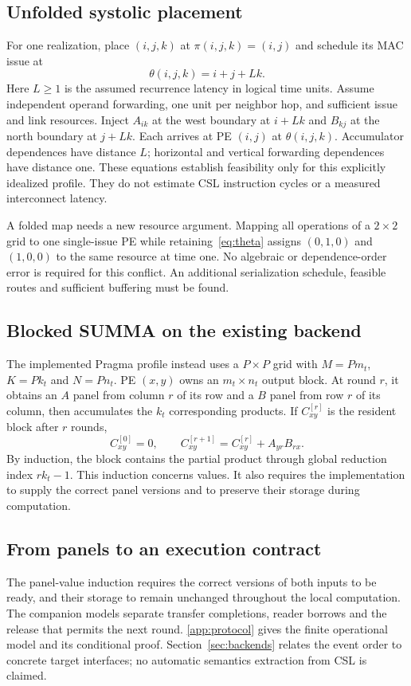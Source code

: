 \documentclass[final,3p,times,authoryear]{elsarticle}
\begin{document}
\subsection{Unfolded systolic placement}
For one realization, place $(i,j,k)$ at $\pi(i,j,k)=(i,j)$ and schedule its MAC issue at
\begin{equation}\label{eq:theta}
 \theta(i,j,k)=i+j+Lk.
\end{equation}
Here $L\ge1$ is the assumed recurrence latency in logical time units. Assume independent operand forwarding, one unit per neighbor hop, and sufficient issue and link resources. Inject $A_{ik}$ at the west boundary at $i+Lk$ and $B_{kj}$ at the north boundary at $j+Lk$. Each arrives at PE $(i,j)$ at $\theta(i,j,k)$. Accumulator dependences have distance $L$; horizontal and vertical forwarding dependences have distance one. These equations establish feasibility only for this explicitly idealized profile. They do not estimate CSL instruction cycles or a measured interconnect latency.

A folded map needs a new resource argument. Mapping all operations of a $2\times2$ grid to one single-issue PE while retaining~\eqref{eq:theta} assigns $(0,1,0)$ and $(1,0,0)$ to the same resource at time one. No algebraic or dependence-order error is required for this conflict. An additional serialization schedule, feasible routes and sufficient buffering must be found.

\subsection{Blocked SUMMA on the existing backend}
The implemented Pragma profile instead uses a $P\times P$ grid with $M=Pm_t$, $K=Pk_t$ and $N=Pn_t$. PE $(x,y)$ owns an $m_t\times n_t$ output block. At round $r$, it obtains an $A$ panel from column $r$ of its row and a $B$ panel from row $r$ of its column, then accumulates the $k_t$ corresponding products. If $C_{xy}^{[r]}$ is the resident block after $r$ rounds,
\begin{equation}\label{eq:summa}
 C_{xy}^{[0]}=0,\qquad
 C_{xy}^{[r+1]}=C_{xy}^{[r]}+A_{yr}B_{rx}.
\end{equation}
By induction, the block contains the partial product through global reduction index $rk_t-1$. This induction concerns values. It also requires the implementation to supply the correct panel versions and to preserve their storage during computation.


\subsection{From panels to an execution contract}
The panel-value induction requires the correct versions of both inputs to be ready, and their storage to remain unchanged throughout the local computation. The companion models separate transfer completions, reader borrows and the release that permits the next round. \ref{app:protocol} gives the finite operational model and its conditional proof. Section~\ref{sec:backends} relates the event order to concrete target interfaces; no automatic semantics extraction from CSL is claimed.
\end{document}
